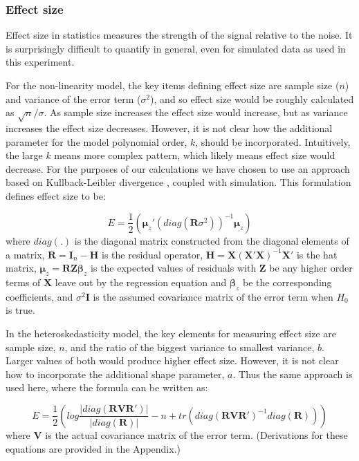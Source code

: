 \documentclass[]{interact}
\theoremstyle{plain}%
\theoremstyle{definition}
\theoremstyle{remark}
\begin{document}
\hypertarget{effect-size}{%
\subsubsection{Effect size}\label{effect-size}}

Effect size in statistics measures the strength of the signal relative
to the noise. It is surprisingly difficult to quantify in general, even
for simulated data as used in this experiment.

For the non-linearity model, the key items defining effect size are
sample size (\(n\)) and variance of the error term (\(\sigma^2\)), and
so effect size would be roughly calculated as \(\sqrt{n}/{\sigma}\). As
sample size increases the effect size would increase, but as variance
increases the effect size decreases. However, it is not clear how the
additional parameter for the model polynomial order, \(k\), should be
incorporated. Intuitively, the large \(k\) means more complex pattern,
which likely means effect size would decrease. For the purposes of our
calculations we have chosen to use an approach based on Kullback-Leibler
divergence \citep{kullback1951information}, coupled with simulation.
This formulation defines effect size to be:

\[E = \frac{1}{2}\left(\boldsymbol{\mu}_z'(diag(\boldsymbol{R}\sigma^2))^{-1}\boldsymbol{\mu}_z\right)\]
\noindent where \(diag(.)\) is the diagonal matrix constructed from the
diagonal elements of a matrix,
\(\boldsymbol{R} = \boldsymbol{I}_n - \boldsymbol{H}\) is the residual
operator,
\(\boldsymbol{H} = \boldsymbol{X}(\boldsymbol{X}'\boldsymbol{X})^{-1}\boldsymbol{X}'\)
is the hat matrix,
\(\boldsymbol{\mu}_z = \boldsymbol{R}\boldsymbol{Z}\boldsymbol{\beta}_z\)
is the expected values of residuals with \(\boldsymbol{Z}\) be any
higher order terms of \(\boldsymbol{X}\) leave out by the regression
equation and \(\boldsymbol{\beta}_z\) be the corresponding coefficients,
and \(\sigma^2\boldsymbol{I}\) is the assumed covariance matrix of the
error term when \(H_0\) is true.

In the heteroskedasticity model, the key elements for measuring effect
size are sample size, \(n\), and the ratio of the biggest variance to
smallest variance, \(b\). Larger values of both would produce higher
effect size. However, it is not clear how to incorporate the additional
shape parameter, \(a\). Thus the same approach is used here, where the
formula can be written as:

\[E = \frac{1}{2}\left(log\frac{|diag(\boldsymbol{R}\boldsymbol{V}\boldsymbol{R}')|}{|diag(\boldsymbol{R})|} - n + tr(diag(\boldsymbol{R}\boldsymbol{V}\boldsymbol{R}')^{-1}diag(\boldsymbol{R}))\right)\]
\noindent where \(\boldsymbol{V}\) is the actual covariance matrix of
the error term. (Derivations for these equations are provided in the
Appendix.)
\end{document}
